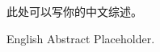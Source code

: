 %

\begin{cabstract}

此处可以写你的中文综述。

\end{cabstract}

\begin{eabstract}

English Abstract Placeholder.

\end{eabstract}

